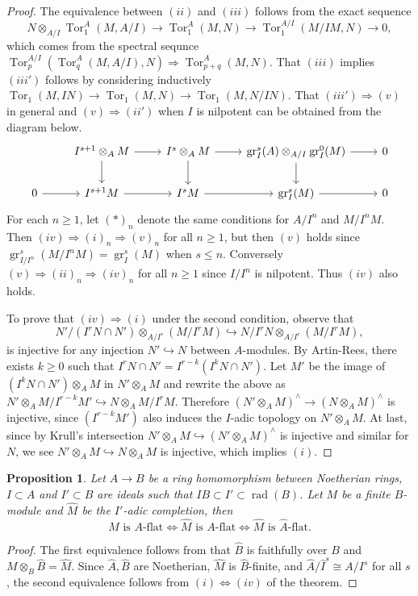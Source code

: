 \documentclass[leqno]{amsart}
\DeclareMathOperator{\gr}{gr}
\DeclareMathOperator{\rad}{rad}
\newcommand{\1}{\mathbf{1}}
\DeclareMathOperator{\Tor}{Tor}
\newtheorem{prop}[thm]{Proposition}
\theoremstyle{definition}
\theoremstyle{remark}
\begin{document}
\begin{proof}
	The equivalence between $(ii)$ and $(iii)$ follows from 
	the exact sequence
	\[
		N\otimes_{A/I}\Tor^A_1(M,A/I)\to 
		\Tor^A_1(M,N)\to 
		\Tor^{A/I}_1(M/IM,N)\to 0,
	\]
	which comes from the spectral sequnce  
	$\Tor^{A/I}_p(\Tor^A_q(M,A/I),N)\Longrightarrow\Tor_{p+q}^A(M,N)$.
	That $(iii)$ implies $(iii')$ follows by considering inductively
	$\Tor_1(M,IN)\to \Tor_1(M,N)\to \Tor_1(M,N/IN)$.
	That $(iii')\Longrightarrow(v)$ in general and 
	$(v)\Longrightarrow(ii')$ when $I$ is nilpotent 
	can be obtained from the diagram below.
	\[
		\begin{tikzcd}
			&I^{s+1}\otimes_AM\arrow[d]\arrow[r]
				&I^{s}\otimes_AM\arrow[d]\arrow[r]
					& \gr^s_I(A)\otimes_{A/I}
					\gr^0_I(M) \arrow[r]\arrow[d]
						&0\\
		0\arrow[r]
			&I^{s+1}M\arrow[r]
				&I^{s}M\arrow[r]
					&\gr^s_I(M)\arrow[r]
						&0
		\end{tikzcd}
	\]
	For each $n\geq1$, let  $(*)_n$ denote the same conditions
	for  $A/I^n$ and  $M/I^nM$.
	Then $(iv)\Longrightarrow(i)_n\Longrightarrow(v)_n$ for all  $n\geq 1$,
	but then $(v)$ holds since
	$\gr^s_{I/I^n}(M/I^nM)=\gr^s_I(M)$ when $s\leq n$.
	Conversely $(v)\Longrightarrow(ii)_n\Longrightarrow(iv)_n$
	for all $n\geq1$ since $I/I^n$ is nilpotent.
	Thus $(iv)$ also holds.

	To prove that $(iv)\Longrightarrow(i)$ under the second condition,
	observe that 
	\[
		 N'/(I^rN\cap N')\otimes_{A/I^r}(M/I^rM)\hookrightarrow
		 N/I^rN\otimes_{A/I^r}(M/I^rM),
	\]
	is injective for any injection 
	$N'\hookrightarrow N$ between $A$-modules. 
	By Artin-Rees, there exists $k\geq 0$
	such that  $I^rN\cap N'=I^{r-k}(I^kN\cap N')$.
	Let $M'$ be the image of  $(I^kN\cap N')\otimes_AM$
	in  $N'\otimes_AM$ and rewrite the above as
	$N'\otimes_AM/I^{r-k}M'\hookrightarrow N\otimes_AM/I^rM$.
	Therefore
	$(N'\otimes_AM)^\wedge\to(N\otimes_AM)^\wedge$ is injective,
	since $(I^{r-k}M')$ also induces 
	the $I$-adic topology on $N'\otimes_AM$.
	At last, since by Krull's intersection
	$N'\otimes_AM\hookrightarrow (N'\otimes_AM)^\wedge$
	is injective and similar for $N$,
	we see $N'\otimes_AM\hookrightarrow N\otimes_AM$
	is injective, which implies  $(i)$.
\end{proof}

\begin{prop}
	Let $A\to B$ be a ring homomorphism between Noetherian rings,
	$I\subset A$ and  $I'\subset B$
	are ideals such that $IB\subset I'\subset \rad(B)$.
	Let  $M$ be a finite  $B$-module and 
	$\hat{M}$ be the $I'$-adic completion, then
	\[
		M\text{ is }A\text{-flat}\Longleftrightarrow
		\hat{M}\text{ is }A\text{-flat}\Longleftrightarrow
		\hat{M}\text{ is }\hat{A}\text{-flat}.
	\]
\end{prop}
\begin{proof}
	The first equivalence follows from that 
	$\hat{B}$ is faithfully over $B$ and $M\otimes_B\hat{B}=\hat{M}$.
	Since $\hat{A}, \hat{B}$ are Noetherian,
	$\hat{M}$ is $\hat{B}$-finite,
	and $ \hat{A}/\hat{I}^s\cong A/I^s$ for all $s$,
	the second equivalence follows from 
	$(i)\Longleftrightarrow(iv)$ of the theorem.
\end{proof}
\end{document}
